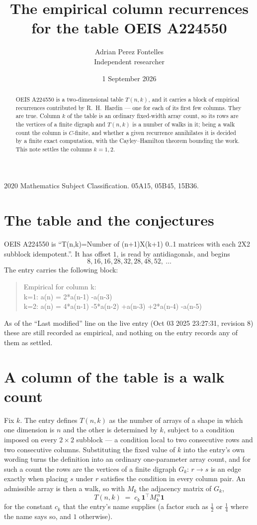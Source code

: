 \documentclass[11pt,a4paper]{article}
\title{The empirical column recurrences for the table OEIS A224550}
\author{Adrian Perez Fontelles\\ \small Independent researcher}
\date{1 September 2026}
\theoremstyle{plain}
\theoremstyle{definition}
\begin{document}
\maketitle

\begin{abstract}
OEIS A224550 is a two-dimensional table $T(n,k)$, and it carries a block of empirical
recurrences contributed by R.~H.~Hardin --- one for each of its first few columns. They are
true. Column $k$ of the table is an ordinary fixed-width array count, so its rows are the
vertices of a finite digraph and $T(n,k)$ is a number of walks in it; being a walk count the
column is $C$-finite, and whether a given recurrence annihilates it is decided by a finite
exact computation, with the Cayley--Hamilton theorem bounding the work. This note settles the columns $k=1, 2$.
\end{abstract}

\noindent\small 2020 Mathematics Subject Classification. 05A15, 05B45, 15B36.\normalsize

\section{The table and the conjectures}

OEIS A224550 is ``T(n,k)=Number of (n+1)X(k+1) 0..1 matrices with each 2X2 subblock idempotent.''. It has offset $1$, is
read by antidiagonals, and begins
\[
8, 16, 16, 28, 32, 28, 48, 52,\ \dots
\]
The entry carries the following block:
\begin{quote}\small
Empirical for column k:\\
k=1: a(n) = 2*a(n-1) -a(n-3)\\
k=2: a(n) = 4*a(n-1) -5*a(n-2) +a(n-3) +2*a(n-4) -a(n-5)\\
\end{quote}
As of the ``Last modified'' line on the live entry (Oct 03 2025 23:27:31, revision 8) these are still
recorded as empirical, and nothing on the entry records any of them as settled.

\section{A column of the table is a walk count}

Fix $k$. The entry defines $T(n,k)$ as the number of arrays of a shape in which one dimension
is $n$ and the other is determined by $k$, subject to a condition imposed on every
$2\times2$ subblock --- a condition local to two consecutive rows and two consecutive columns.
Substituting the fixed value of $k$ into the entry's own wording turns the definition into an
ordinary one-parameter array count, and for such a count the rows are the vertices of a finite
digraph $G_k$: $r\to s$ is an edge exactly when placing $s$ under $r$ satisfies the condition
in every column pair. An admissible array is then a walk, so with $M_k$ the adjacency matrix
of $G_k$,
\[
T(n,k)\;=\;c_k\,\mathbf{1}^{\!\top}M_k^{\,n}\mathbf{1}
\]
for the constant $c_k$ that the entry's name supplies (a factor such as $\tfrac12$ or
$\tfrac14$ where the name says so, and $1$ otherwise).
\end{document}
